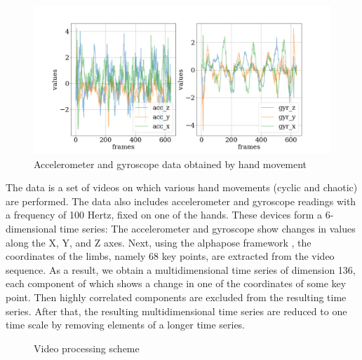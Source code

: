 \documentclass[bst/sn-mathphys]{sn-jnl}%
\theoremstyle{thmstyleone}%
\theoremstyle{thmstyletwo}%
\theoremstyle{thmstylethree}%
\begin{document}
\begin{figure}[bhtp]
	\includegraphics[width=\textwidth]{cyclic_devices_data.png}
	\caption{Accelerometer and gyroscope data obtained by hand movement}
	\label{fig:devices_data}
\end{figure}
The data is a set of videos on which various hand movements (cyclic and chaotic) are performed. 
The data also includes accelerometer and gyroscope readings with a frequency of 100 Hertz, fixed on one of the hands.
These devices form a 6-dimensional time series: The accelerometer and gyroscope show changes in values along the X, Y, and Z axes.
Next, using the alphapose framework \cite{alphapose_fang2017rmpe, alphapose_li2019crowdpose, alphapose_xiu2018poseflow}, the coordinates of the limbs, namely 68 key points, are extracted from the video sequence.
As a result, we obtain a multidimensional time series of dimension 136, each component of which shows a change in one of the coordinates of some key point.
Then highly correlated components are excluded from the resulting time series.
After that, the resulting multidimensional time series are reduced to one time scale by removing elements of a longer time series.

\begin{figure}[bhtp]
	\centering
	\caption{Video processing scheme}
	\label{fig:video_data}
\end{figure}
\end{document}
